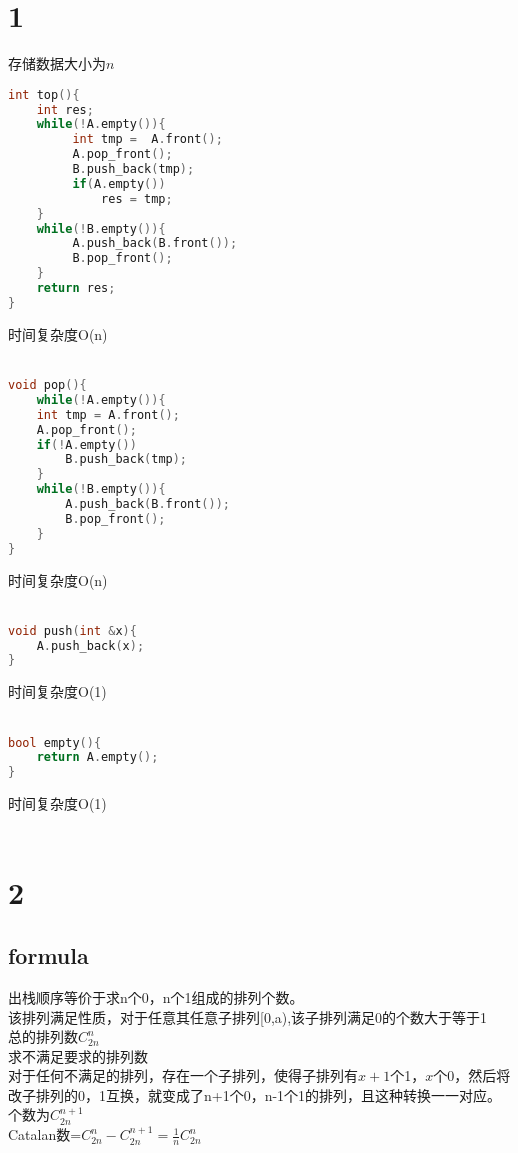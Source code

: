 \documentclass[a4paper]{article}
\begin{document}
\section*{1}
存储数据大小为$n$
\begin{lstlisting}[language=C++]
int top(){
	int res;
	while(!A.empty()){
	     int tmp =  A.front();
	     A.pop_front();
         B.push_back(tmp);
         if(A.empty())
             res = tmp;	
	}
	while(!B.empty()){
	     A.push_back(B.front());
	     B.pop_front();
	}
	return res;
}
\end{lstlisting}
时间复杂度O(n)\\
\\
\begin{lstlisting}[language=C++]
void pop(){
	while(!A.empty()){
	int tmp = A.front();
	A.pop_front();
	if(!A.empty())
        B.push_back(tmp);
	}
	while(!B.empty()){
	    A.push_back(B.front());
	    B.pop_front();
	}
}
\end{lstlisting}
时间复杂度O(n)\\
\\
\begin{lstlisting}[language=C++]
void push(int &x){
	A.push_back(x);
}
\end{lstlisting}
时间复杂度O(1)\\
\\
\begin{lstlisting}[language=C++]
bool empty(){
	return A.empty();
}
\end{lstlisting}
时间复杂度O(1)\\
\\
\section*{2}
\subsection*{formula}
出栈顺序等价于求n个0，n个1组成的排列个数。\\
该排列满足性质，对于任意其任意子排列[0,a),该子排列满足0的个数大于等于1\\
总的排列数$C_{2n}^n$\\
求不满足要求的排列数\\
对于任何不满足的排列，存在一个子排列，使得子排列有$x+1$个1，$x$个0，然后将改子排列的0，1互换，就变成了n+1个0，n-1个1的排列，且这种转换一一对应。个数为$C_{2n}^{n+1}$\\
Catalan数=$C_{2n}^n-C_{2n}^{n+1}=\frac{1}{n}C_{2n}^n$
\end{document}
